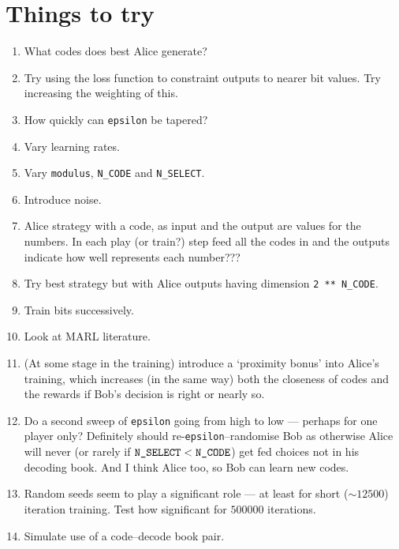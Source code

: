 \documentclass[12pt]{article}
\begin{document}
\section{Things to try}

\begin{enumerate}
	\item What codes does best Alice generate?
	
	\item Try using the loss function to constraint outputs to nearer bit values.  Try increasing the weighting of this.
	
	\item How quickly can \verb|epsilon| be tapered? 
	
	\item Vary learning rates.
	
	\item Vary \verb|modulus|, \verb|N_CODE| and \verb|N_SELECT|.
	
	\item Introduce noise.
	
	\item Alice strategy with a code, as input and the output are values for the numbers.  In each play (or train?) step feed all the codes in and the outputs indicate how well represents each number???
	
	\item Try best strategy but with Alice outputs having dimension \verb|2 ** N_CODE|.
	
	\item Train bits successively. 
	
	\item Look at MARL literature.
	
	\item (At some stage in the training) introduce a `proximity bonus' into Alice's training, which increases (in the same way) both the closeness of codes and the rewards if Bob's decision is right or nearly so.
	
	\item Do a second sweep of \verb|epsilon| going from high to low --- perhaps for one player only?  Definitely should re-\verb|epsilon|--randomise Bob as otherwise Alice will never (or rarely if $\verb|N_SELECT| < \verb|N_CODE|$) get fed choices not in his decoding book.  And I think Alice too, so Bob can learn new codes.
	
	\item Random seeds seem to play a significant role --- at least for short ($\sim \num{12500}$) iteration training.  Test how significant for $\num{500000}$ iterations.
	
	\item Simulate use of a code--decode book pair.
	
\end{enumerate}







\end{document}
